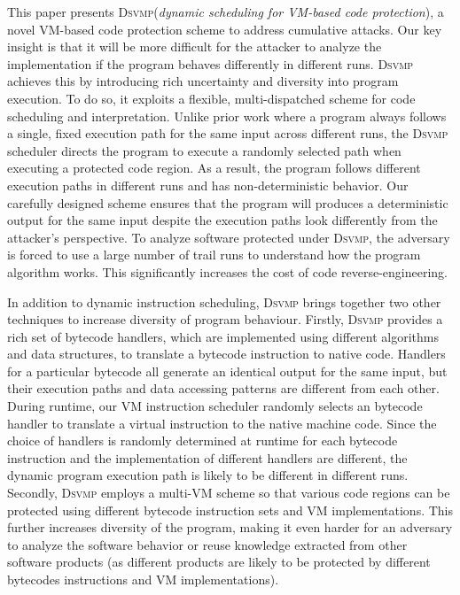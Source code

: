 \documentclass[conference]{IEEEtran}
\newcommand{\DSVMP}{\textsc{Dsvmp}\xspace}
\begin{document}
This paper presents \DSVMP (\emph{dynamic scheduling for VM-based code protection}),
a novel VM-based code protection scheme to address cumulative attacks.
Our key insight is that it will be more difficult for the attacker
to analyze the implementation if the program behaves differently in different runs.
\DSVMP achieves this by introducing rich uncertainty and diversity into program execution.
To do so, it exploits a flexible, multi-dispatched scheme for code scheduling and interpretation.
Unlike prior work where a program always follows a single, fixed execution path for the same input across different runs,
the \DSVMP scheduler directs the program to execute a randomly selected path when executing a protected code region.
As a result, the program follows different execution paths in different runs and has non-deterministic behavior.
Our carefully designed scheme ensures that the program will produces a deterministic output
for the same input despite the execution paths look differently from the attacker's perspective.
To analyze software protected under \DSVMP, the adversary is forced to use a large number of trail runs
to understand how the program algorithm works. This significantly increases the cost of code reverse-engineering.


In addition to dynamic instruction scheduling, \DSVMP brings together two other techniques to increase diversity of program behaviour.
Firstly, \DSVMP provides a rich set of bytecode handlers, which are implemented using different algorithms and data structures,
to translate a bytecode instruction to native code.
Handlers for a particular bytecode all generate an identical output for the same input,
but their execution paths and data accessing patterns are different from each other.
During runtime, our VM instruction scheduler randomly selects an bytecode handler
to translate a virtual instruction to the native machine code.
Since the choice of handlers is randomly determined at runtime for each bytecode
instruction and the implementation of different handlers are different,
the dynamic program execution path is likely to be different in different runs.
Secondly, \DSVMP employs a multi-VM scheme so that various code regions
can be protected using different bytecode instruction sets and VM implementations.
This further increases diversity of the program, making it even harder for an adversary to analyze
the software behavior or reuse knowledge extracted from other software products
(as different products are likely to be protected by different bytecodes instructions and VM implementations).
\end{document}
